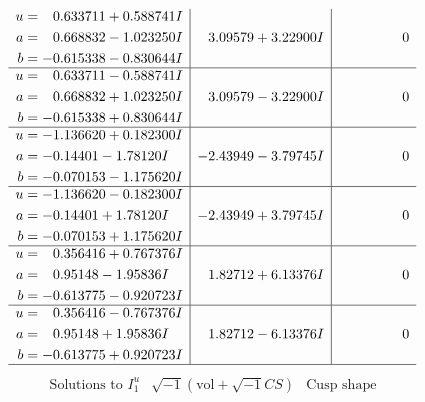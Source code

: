 \documentclass[1p]{elsarticle_modified}
\theoremstyle{definition}
\newcommand{\I}{\sqrt{-1}}
\begin{document}
$$\begin{array}{c|c|c}
\begin{aligned}
u &= \phantom{-}0.633711 + 0.588741 I \\
a &= \phantom{-}0.668832 - 1.023250 I \\
b &= -0.615338 - 0.830644 I\end{aligned}
 & \phantom{-}3.09579 + 3.22900 I & \phantom{-0.000000 } 0 \\ \hline\begin{aligned}
u &= \phantom{-}0.633711 - 0.588741 I \\
a &= \phantom{-}0.668832 + 1.023250 I \\
b &= -0.615338 + 0.830644 I\end{aligned}
 & \phantom{-}3.09579 - 3.22900 I & \phantom{-0.000000 } 0 \\ \hline\begin{aligned}
u &= -1.136620 + 0.182300 I \\
a &= -0.14401 - 1.78120 I \\
b &= -0.070153 - 1.175620 I\end{aligned}
 & -2.43949 - 3.79745 I & \phantom{-0.000000 } 0 \\ \hline\begin{aligned}
u &= -1.136620 - 0.182300 I \\
a &= -0.14401 + 1.78120 I \\
b &= -0.070153 + 1.175620 I\end{aligned}
 & -2.43949 + 3.79745 I & \phantom{-0.000000 } 0 \\ \hline\begin{aligned}
u &= \phantom{-}0.356416 + 0.767376 I \\
a &= \phantom{-}0.95148 - 1.95836 I \\
b &= -0.613775 - 0.920723 I\end{aligned}
 & \phantom{-}1.82712 + 6.13376 I & \phantom{-0.000000 } 0 \\ \hline\begin{aligned}
u &= \phantom{-}0.356416 - 0.767376 I \\
a &= \phantom{-}0.95148 + 1.95836 I \\
b &= -0.613775 + 0.920723 I\end{aligned}
 & \phantom{-}1.82712 - 6.13376 I & \phantom{-0.000000 } 0\\
 \hline 
 \end{array}$$\newpage$$\begin{array}{c|c|c}  
\text{Solutions to }I^u_{1}& \I (\text{vol} + \sqrt{-1}CS) & \text{Cusp shape}\\
 \hline 
\begin{aligned}

\end{aligned}
\end{array}$$
\end{document}
